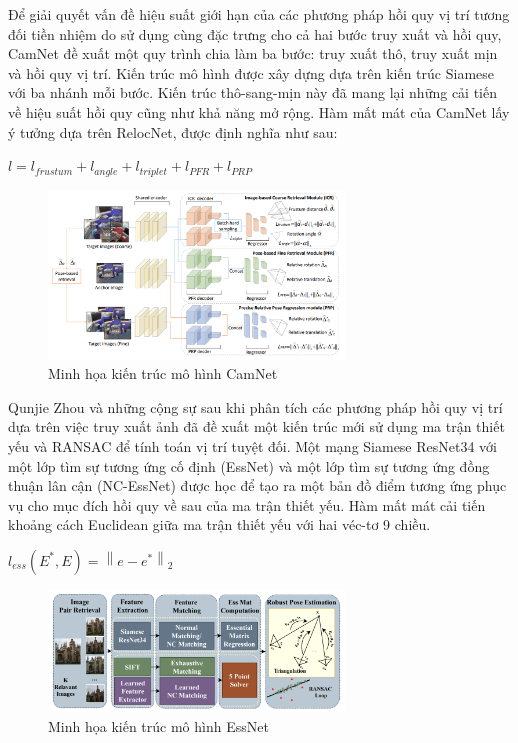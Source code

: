 Để giải quyết vấn đề hiệu suất giới hạn của các phương pháp hồi quy vị trí tương đối tiền nhiệm do sử dụng cùng đặc trưng cho cả hai bước truy xuất và hồi quy, CamNet \cite{9008579} đề xuất một quy trình chia làm ba bước: truy xuất thô, truy xuất mịn và hồi quy vị trí. Kiến trúc mô hình được xây dựng dựa trên kiến trúc Siamese với ba nhánh mỗi bước. Kiến trúc thô-sang-mịn này đã mang lại những cải tiến về hiệu suất hồi quy cũng như khả năng mở rộng. Hàm mất mát của CamNet lấy ý tưởng dựa trên RelocNet, được định nghĩa như sau:
\begin{center}
    $l = l_{frustum} + l_{angle} + l_{triplet} + l_{PFR} + l_{PRP}$
\end{center}
\begin{figure}[H]
    \centering
    \includegraphics[width=0.7\textwidth]{pics/Chapter2/camnet.png}
    \caption{Minh họa kiến trúc mô hình CamNet \cite{9008579}}
\end{figure}
Qunjie Zhou và những cộng sự \cite{zhou2020learn} sau khi phân tích các phương pháp hồi quy vị trí dựa trên việc truy xuất ảnh đã đề xuất một kiến trúc mới sử dụng ma trận thiết yếu và RANSAC để tính toán vị trí tuyệt đối. Một mạng Siamese ResNet34 với một lớp tìm sự tương ứng cố định (EssNet) và một lớp tìm sự tương ứng đồng thuận lân cận (NC-EssNet) được học để tạo ra một bản đồ điểm tương ứng phục vụ cho mục đích hồi quy về sau của ma trận thiết yếu. Hàm mất mát cải tiến khoảng cách Euclidean giữa ma trận thiết yếu với hai véc-tơ 9 chiều.
\begin{center}
    $l_{ess}(E^*, E) = \left \| e - e^* \right \|_2$
\end{center}
\begin{figure}[H]
    \centering
    \includegraphics[width=0.7\textwidth]{pics/Chapter2/essnet.png}
    \caption{Minh họa kiến trúc mô hình EssNet \cite{zhou2020learn}}
\end{figure}

